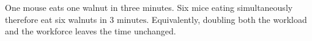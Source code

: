 One mouse eats one walnut in three minutes. Six mice eating simultaneously therefore eat six walnuts in $\boxed{3\text{ minutes}}$. Equivalently, doubling both the workload and the workforce leaves the time unchanged.
